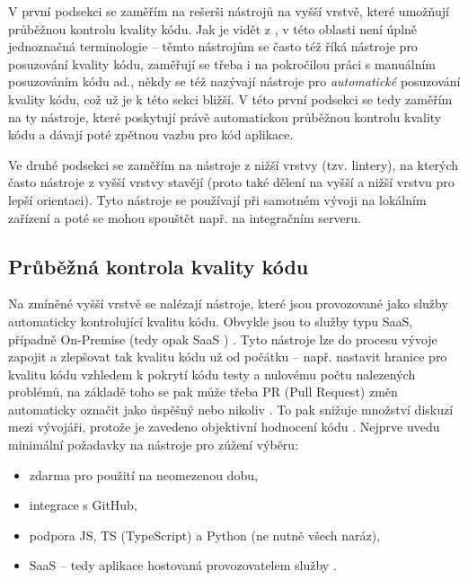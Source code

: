 V první podsekci se zaměřím na rešerši nástrojů na vyšší vrstvě, které umožňují průběžnou kontrolu kvality kódu. Jak je vidět z \cite{guru-codereview, gh-awesomecodereview, medium-devgurus,stackshare-codereview, gh-awesomecodereview2}, v této oblasti není úplně jednoznačná terminologie -- těmto nástrojům se často též říká nástroje pro posuzování kvality kódu, zaměřují se třeba i na pokročilou práci s manuálním posuzováním kódu ad., někdy se též nazývají nástroje pro \textit{automatické} posuzování kvality kódu, což už je k této sekci bližší. V této první podsekci se tedy zaměřím na ty nástroje, které poskytují právě automatickou průběžnou kontrolu kvality kódu a dávají poté zpětnou vazbu pro kód aplikace.

Ve druhé podsekci se zaměřím na nástroje z nižší vrstvy (tzv. lintery), na kterých často nástroje z vyšší vrstvy stavějí (proto také dělení na vyšší a nižší vrstvu pro lepší orientaci). Tyto nástroje se používají při samotném vývoji na lokálním zařízení a poté se mohou spouštět např. na integračním serveru.

\subsection{Průběžná kontrola kvality kódu}\label{subsec:prubeznakontrolakvalitykodu}

Na zmíněné vyšší vrstvě se nalézají nástroje, které jsou provozované jako služby automaticky kontrolující kvalitu kódu. Obvykle jsou to služby typu SaaS, případně On-Premise (tedy opak SaaS \cite{globema-onpremise}) \cite{codebeat-engines}. Tyto nástroje lze do procesu vývoje zapojit a zlepšovat tak kvalitu kódu už od počátku -- např. nastavit hranice pro kvalitu kódu vzhledem k pokrytí kódu testy a nulovému počtu nalezených problémů, na základě toho se pak může třeba PR (Pull Request) změn automaticky označit jako úspěšný nebo nikoliv \cite{medium-devgurus}. To pak snižuje množství diskuzí mezi vývojáři, protože je zavedeno objektivní hodnocení kódu \cite{medium-devgurus}. Nejprve uvedu minimální požadavky na nástroje pro zúžení výběru:
\begin{itemize}
    \item zdarma pro použití na neomezenou dobu,
    \item integrace s GitHub,
    \item podpora JS, TS (TypeScript) a Python (ne nutně všech naráz),
    \item SaaS -- tedy aplikace hostovaná provozovatelem služby \cite{oracle-saas}.
\end{itemize}

